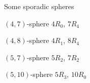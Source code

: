\documentclass[%
pdf,
colorBG,
slideColor,
]{prosper}
\begin{document}
\begin{slide}{Some sporadic spheres}
\vspace{-3mm}
\begin{center}
\begin{minipage}{5.1cm}
\centering
{}\par
$(4,7)$-sphere $4R_0$, $7R_4$
\end{minipage}
\begin{minipage}{5.1cm}
\centering
{}\par
$(4,8)$-sphere $4R_1$, $8R_4$
\end{minipage}
\begin{minipage}{5.1cm}
\centering
{}\par
$(5,7)$-sphere $5R_2$, $7R_2$
\end{minipage}
\begin{minipage}{5.1cm}
\centering
{}\par
$(5,10)$-sphere $5R_3$, $10R_0$
\end{minipage}
\end{center}

\end{slide}
\end{document}
